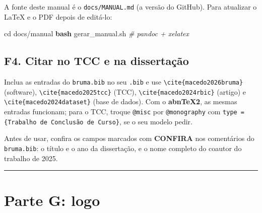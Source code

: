 \documentclass[
  10pt,
]{article}
\newenvironment{Shaded}{\begin{snugshade}}{\end{snugshade}}
\newcommand{\BuiltInTok}[1]{#1}
\newcommand{\CommentTok}[1]{\textcolor[rgb]{0.56,0.35,0.01}{\textit{#1}}}
\newcommand{\FunctionTok}[1]{\textcolor[rgb]{0.13,0.29,0.53}{\textbf{#1}}}
\newcommand{\NormalTok}[1]{#1}
\begin{document}
A fonte deste manual é o
\texttt{docs/\allowbreak{}MANUAL.\allowbreak{}md} (a versão do GitHub).
Para atualizar o LaTeX e o PDF depois de editá-lo:

\begin{Shaded}
\begin{Highlighting}[]
\BuiltInTok{cd}\NormalTok{ docs/manual}
\FunctionTok{bash}\NormalTok{ gerar\_manual.sh             }\CommentTok{\# pandoc + xelatex}
\end{Highlighting}
\end{Shaded}

\hypertarget{f4.-citar-no-tcc-e-na-dissertauxe7uxe3o}{%
\subsection{F4. Citar no TCC e na
dissertação}\label{f4.-citar-no-tcc-e-na-dissertauxe7uxe3o}}

Inclua as entradas do \texttt{bruma.\allowbreak{}bib} no seu
\texttt{.\allowbreak{}bib} e use
\texttt{\textbackslash\allowbreak{}cite\{macedo2026bruma\}} (software),
\texttt{\textbackslash\allowbreak{}cite\{macedo2025tcc\}} (TCC),
\texttt{\textbackslash\allowbreak{}cite\{macedo2024rbic\}} (artigo) e
\texttt{\textbackslash\allowbreak{}cite\{macedo2024dataset\}} (base de
dados). Com o \textbf{abnTeX2}, as mesmas entradas funcionam; para o
TCC, troque \texttt{@misc} por \texttt{@monography} com
\texttt{type = \{Trabalho de Conclusão de Curso\}}, se o seu modelo
pedir.

Antes de usar, confira os campos marcados com \textbf{CONFIRA} nos
comentários do \texttt{bruma.\allowbreak{}bib}: o título e o ano da
dissertação, e o nome completo do coautor do trabalho de 2025.

\begin{center}\rule{0.5\linewidth}{0.5pt}\end{center}

\hypertarget{parte-g-logo}{%
\section{Parte G: logo}\label{parte-g-logo}}
\end{document}
